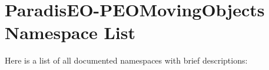 \section{Paradis\-EO-PEOMoving\-Objects Namespace List}
Here is a list of all documented namespaces with brief descriptions:\begin{CompactList}
\item{}
\end{CompactList}
